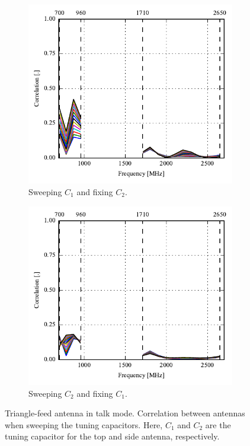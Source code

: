\begin{figure}[htbp]
    \centering
    \begin{subfigure}{0.49\linewidth}
        \includegraphics{img/tech_sol/trianglefeed/talk_mode/correlation_Csh1-sweep}
        \caption{Sweeping $C_1$ and fixing $C_2$.}
    \end{subfigure}
    \hfill
    \begin{subfigure}{0.49\linewidth}
        \includegraphics{img/tech_sol/trianglefeed/talk_mode/correlation_Csh2-sweep}
        \caption{Sweeping $C_2$ and fixing $C_1$.}
    \end{subfigure}
    \caption{Triangle-feed antenna in talk mode. Correlation between antennas when sweeping the tuning capacitors. Here, $C_1$ and $C_2$ are the tuning capacitor for the top and side antenna, respectively.}
    \label{fig:corr_sol2_talk}
\end{figure}

